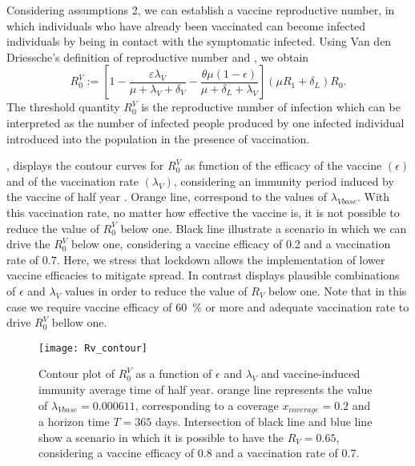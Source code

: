 %
%
%
Considering assumptions 2, we can establish a vaccine reproductive number,
in which individuals who have already been vaccinated
can become infected individuals by being in contact with the
symptomatic infected. Using Van den Driessche’s \cite{VandenDriessche2017a}
definition of reproductive number and \cite{Alexander2004}, we obtain
\begin{equation*}
    R_{0}^V := \left[ 
        1-\frac{\varepsilon \lambda_V}{\mu+\lambda_V+\delta_V}
        -\frac{\theta\mu(1-\epsilon)}{\mu+\delta_L+\lambda_V}
    \right]
    (\mu R_1+\delta_L)R_0.
\end{equation*}
%
The threshold quantity $R_0^V$ is the reproductive number of infection
which can be interpreted as the number of infected people produced
by one infected individual introduced into the population in the
presence of vaccination.

, displays the contour curves for $ R_0^V $ as function
of the efficacy of the vaccine $ (\epsilon) $ and of the vaccination rate 
$(\lambda_V)$, considering an immunity period induced by the vaccine of half year . 
Orange line, correspond to the values of $\lambda_{Vbase}$. With this vaccination
rate, no matter how effective the vaccine is, it is not possible
to reduce the value of $R_0^V$ below one. Black line illustrate a scenario in
which we can drive the $R_0^V$  below one, considering a vaccine
efficacy of \num{0.2} and a  vaccination rate of \num{0.7}.
Here, we stress that lockdown allows the implementation of lower vaccine
efficacies to mitigate spread.
In contrast  displays  plausible
combinations of $\epsilon$ and $\lambda_V$ values
in order to reduce the value of $R_V$ below one. Note that in this case
we require vaccine efficacy of \SI{60}{\percent} or more and
adequate vaccination rate to drive $R_0^V$ bellow one.

\begin{figure*}[tbh]
    \centering
      \texttt{[image: Rv\_contour]}
    \caption{
    Contour plot  of $R_0^V$ as a function of $ \epsilon $ and $ \lambda_V $ and  
        vaccine-induced
        immunity average time of half year. orange line represents the 
        value of $\lambda_{Vbase}=\num{0.000611}$, corresponding to a coverage 
        $x_{coverage} = \num{0.2}$ and a horizon time $T=\num{365}$ days.
        Intersection of black line and blue line show a scenario in which it is
        possible to have the $R_V=0.65$, considering a vaccine efficacy of 
        \num{0.8} and a vaccination rate 
        of \num{0.7}.}
    \label{fig:rvcontour1}
\end{figure*}

